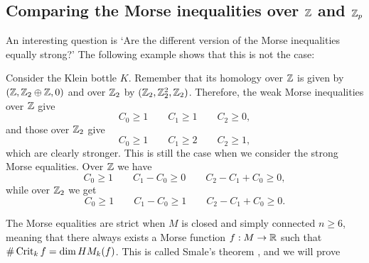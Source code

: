 \subsection{Comparing the Morse inequalities over $\Z$ and $\Z_p$}

An interesting question is `Are the different version of the Morse inequalities equally strong?'
The following example shows that this is not the case:

\begin{eg}
    Consider the Klein bottle $K$.
    Remember that its homology over $\Z$ is given by $(\Z, \Z_2 \oplus \Z, 0)$ and over $ \Z_2$ by $(\Z_2, \Z_2^2, \Z_2)$.
    Therefore, the weak Morse inequalities over $\Z$ give
    \[
    C_0 \ge 1 \qquad C_1 \ge 1 \qquad C_2 \ge 0
    ,\] 
    and those over $\Z_2$ give
    \[
    C_0 \ge  1 \qquad C_1 \ge  2 \qquad C_2 \ge  1
    ,\] 
    which are clearly stronger.
    This is still the case when we consider the strong Morse equalities. Over $ \Z$ we have
    \[
    C_0 \ge  1 \qquad C_1 - C_0 \ge  0 \qquad C_2 - C_1 + C_0 \ge  0
    ,\] 
    while over $\Z_2$ we get
    \[
    C_0 \ge  1 \qquad C_1 - C_0 \ge  1 \qquad C_2 - C_1 + C_0 \ge  0
    .\] 
\end{eg}

\begin{remark}
    The Morse equalities are strict when $M$ is closed and simply connected $n\ge 6$, meaning that there always exists a Morse function $f: M \to  \R$ such that $\# \Crit_k f = \dim \HMf[k]f$. This is called Smale's theorem , and we will prove 
\end{remark}





